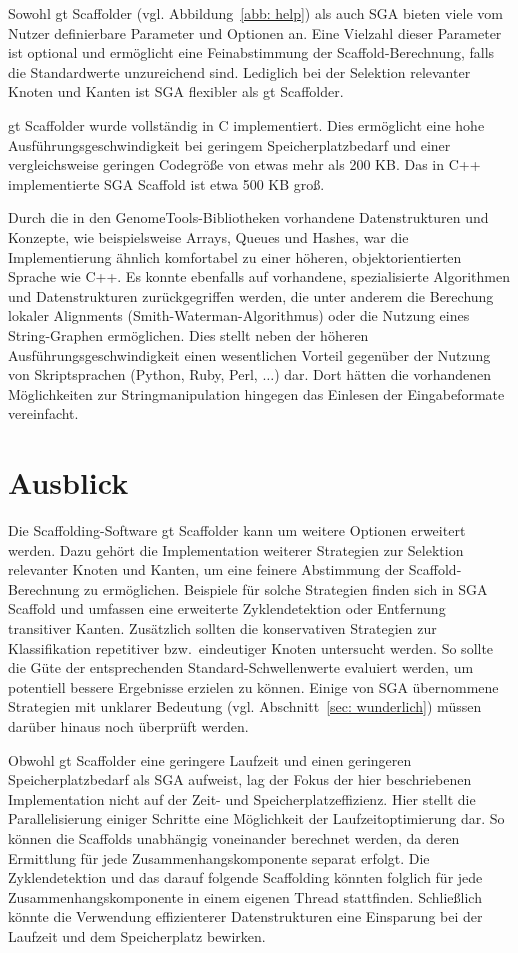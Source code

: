 \documentclass[a4paper,11pt,parskip,abstract=on]{scrartcl}
\begin{document}
Sowohl gt Scaffolder (vgl. Abbildung~\ref{abb: help}) als auch SGA
bieten viele vom Nutzer definierbare Parameter und Optionen an. Eine
Vielzahl dieser Parameter ist optional und ermöglicht eine
Feinabstimmung der Scaffold-Berechnung, falls die Standardwerte
unzureichend sind. Lediglich bei der Selektion relevanter Knoten und
Kanten ist SGA flexibler als gt Scaffolder.

gt Scaffolder wurde vollständig in C implementiert. Dies ermöglicht eine hohe
Ausführungsgeschwindigkeit bei geringem Speicherplatzbedarf und einer
vergleichsweise geringen Codegröße von etwas mehr als 200 KB. Das in C++
implementierte SGA Scaffold ist etwa 500 KB groß.

Durch die in den GenomeTools-Bibliotheken vorhandene Datenstrukturen und
Konzepte, wie beispielsweise Arrays, Queues und Hashes, war die Implementierung
ähnlich komfortabel zu einer höheren, objektorientierten Sprache wie C++. Es
konnte ebenfalls auf vorhandene, spezialisierte Algorithmen und
Datenstrukturen zurückgegriffen werden, die unter anderem die Berechung
lokaler Alignments (Smith-Waterman-Algorithmus) oder die Nutzung eines
String-Graphen ermöglichen. Dies stellt neben der höheren
Ausführungsgeschwindigkeit einen wesentlichen Vorteil gegenüber der Nutzung
von Skriptsprachen (Python, Ruby, Perl, $\ldots$) dar. Dort hätten die
vorhandenen Möglichkeiten zur Stringmanipulation hingegen das Einlesen der
Eingabeformate vereinfacht.

\section{Ausblick}
\label{sec: Ausblick}

Die Scaffolding-Software gt Scaffolder kann um weitere Optionen
erweitert werden. Dazu gehört die Implementation weiterer Strategien
zur Selektion relevanter Knoten und Kanten, um eine feinere Abstimmung
der Scaffold-Berechnung zu ermöglichen. Beispiele für solche Strategien
finden sich in SGA Scaffold und umfassen eine erweiterte
Zyklendetektion oder Entfernung transitiver Kanten.
Zusätzlich sollten die konservativen Strategien zur Klassifikation
repetitiver bzw.\ eindeutiger Knoten untersucht werden. So sollte die Güte
der entsprechenden Standard-Schwellenwerte evaluiert werden, um potentiell
bessere Ergebnisse erzielen zu können. Einige von SGA übernommene
Strategien mit unklarer Bedeutung (vgl. Abschnitt~\ref{sec: wunderlich})
müssen darüber hinaus noch überprüft werden.

Obwohl gt Scaffolder eine geringere Laufzeit und einen geringeren
Speicherplatzbedarf als SGA aufweist, lag der Fokus der hier
beschriebenen Implementation nicht auf der Zeit- und
Speicherplatzeffizienz. Hier stellt die Parallelisierung einiger
Schritte eine Möglichkeit der Laufzeitoptimierung dar. So können die
Scaffolds unabhängig voneinander berechnet werden, da deren Ermittlung
für jede Zusammenhangskomponente separat erfolgt. Die Zyklendetektion
und das darauf folgende Scaffolding könnten folglich für jede
Zusammenhangskomponente in einem eigenen Thread
stattfinden. Schließlich könnte die Verwendung effizienterer
Datenstrukturen eine Einsparung bei der Laufzeit und dem Speicherplatz
bewirken.
\end{document}
